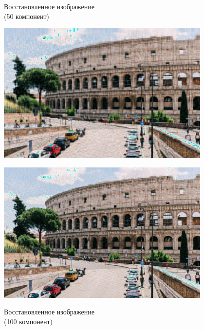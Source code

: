 \documentclass[a4paper]{article}
\begin{document}
\begin{figure}[H]
\centering
    \begin{minipage}{.45\textwidth}
    \caption{Восстановленное изображение \\(50 компонент)}
    \includegraphics[width = 0.95\textwidth]{reconstructions/with_50comps_Colosseum.jpg}
    \label{fig:col_50}
    \end{minipage}%
    \begin{minipage}{.45\textwidth}
      \centering
    \caption{Восстановленное изображение \\(100 компонент)}
    \includegraphics[width = 0.95\textwidth]{reconstructions/with_100comps_Colosseum.jpg}
    \label{fig:col_100}
    \end{minipage}%
\end{figure}
\end{document}
